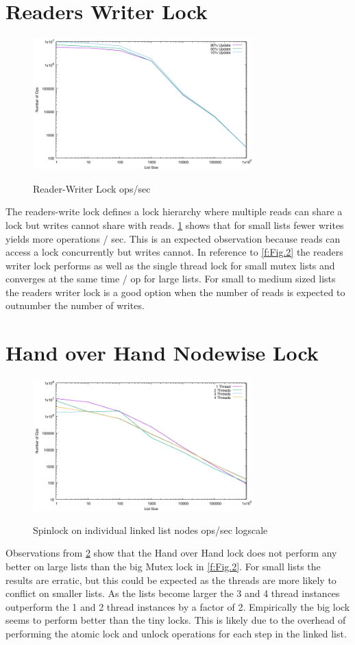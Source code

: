 \documentclass{article}
\begin{document}
\section{Readers Writer Lock}
	\begin{figure}[h]
		\centering
		\includegraphics[height=2in]{outputData/bfl_rw.pdf}
		\label{f:Fig.4}
		\caption{Reader-Writer Lock ops/sec}
	\end{figure}
The readers-write lock defines a lock hierarchy where multiple reads can share a lock but 
writes cannot share with reads. \ref{f:Fig.4} shows that for small lists fewer writes yields 
more operations / sec. This is an expected observation because reads can access a lock 
concurrently but writes cannot. In reference to \ref{f:Fig.2} the readers 
writer lock performs as well as the single thread lock for small mutex lists and converges 
at the same time / op for large lists. For small to medium sized lists the readers writer 
lock is a good option when the number of reads is expected to outnumber the number of 
writes.  

\section{Hand over Hand Nodewise Lock}
	\begin{figure}[h]
		\centering
		\includegraphics[height=2in]{outputData/hhl.pdf}
		\label{f:Fig.5}
		\caption{Spinlock on individual linked list nodes ops/sec logscale}
	\end{figure}
Observations from \ref{f:Fig.5} show that the Hand over Hand lock does not perform any 
better on large lists than the big Mutex lock in \ref{f:Fig.2}. For small lists the 
results are erratic, but this could be expected as the threads are more likely to conflict 
on smaller lists. As the lists become larger the 3 and 4 thread instances outperform the 
1 and 2 thread instances by a factor of 2. Empirically the big lock seems to perform 
better than the tiny locks. This is likely due to the overhead of performing the atomic 
lock and unlock operations for each step in the linked list. 
\end{document}
